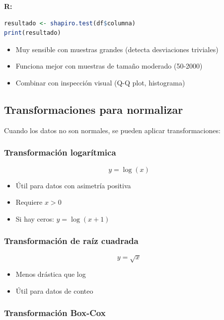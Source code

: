 \documentclass[a4paper,11pt]{article}
\begin{document}
\textbf{R:}
\begin{lstlisting}[language=R]
resultado <- shapiro.test(df$columna)
print(resultado)
\end{lstlisting}

\begin{tcolorbox}[colback=advertenciacolor!20, colframe=red, title=Limitaciones del test de Shapiro-Wilk]
\begin{itemize}
    \item Muy sensible con muestras grandes (detecta desviaciones triviales)
    \item Funciona mejor con muestras de tamaño moderado (50-2000)
    \item Combinar con inspección visual (Q-Q plot, histograma)
\end{itemize}
\end{tcolorbox}

\subsection{Transformaciones para normalizar}

Cuando los datos no son normales, se pueden aplicar transformaciones:

\subsubsection{Transformación logarítmica}

$$y = \log(x)$$

\begin{itemize}
    \item Útil para datos con asimetría positiva
    \item Requiere $x > 0$
    \item Si hay ceros: $y = \log(x + 1)$
\end{itemize}

\subsubsection{Transformación de raíz cuadrada}

$$y = \sqrt{x}$$

\begin{itemize}
    \item Menos drástica que log
    \item Útil para datos de conteo
\end{itemize}

\subsubsection{Transformación Box-Cox}
\end{document}
